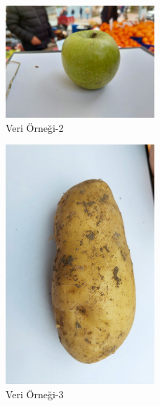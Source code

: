 \documentclass[11pt,a4paper]{report}
\begin{document}
	
	\begin{figure}[!h]
		
		\centering
		\includegraphics[width=0.5\textwidth]{resim2}
		\caption{Veri Örneği-2}
		
	\end{figure}
	
	\begin{figure}[!h]
		
		\centering
		\includegraphics[angle=90,width=0.5\textwidth]{resim3}
		\caption{Veri Örneği-3}
		
	\end{figure}
	
\end{document}
